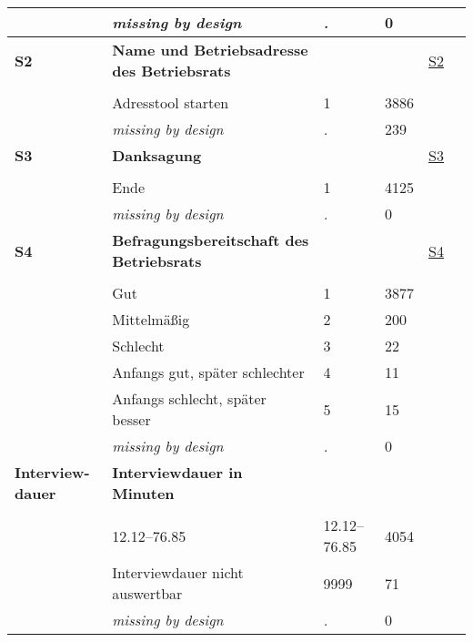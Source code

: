 \begin{longtable}{| L{2.45cm} | L{6cm} | C{1.5cm} | R{1cm} | C{2.25cm} | C{2.25cm} |}
   & \textit{missing by design} & \textit{.} & 0 &  &  \\ 
   \midrule
\textbf{S2}\label{var:S2} & \textbf{Name und Betriebsadresse des Betriebsrats} &  &  & \hyperref[S2]{S2} & \hyperref[var:suf:]{} \\ 
   &  &  &  &  &  \\ 
   & Adresstool starten & 1 & 3886 &  &  \\ 
   & \textit{missing by design} & \textit{.} & 239 &  &  \\ 
   \midrule
\textbf{S3}\label{var:S3} & \textbf{Danksagung} &  &  & \hyperref[S3]{S3} & \hyperref[var:suf:]{} \\ 
   &  &  &  &  &  \\ 
   & Ende & 1 & 4125 &  &  \\ 
   & \textit{missing by design} & \textit{.} & 0 &  &  \\ 
   \midrule
\textbf{S4}\label{var:S4} & \textbf{Befragungsbereitschaft des Betriebsrats} &  &  & \hyperref[S4]{S4} & \hyperref[var:suf:]{} \\ 
   &  &  &  &  &  \\ 
   & Gut & 1 & 3877 &  &  \\ 
   & Mittelmäßig & 2 & 200 &  &  \\ 
   & Schlecht & 3 & 22 &  &  \\ 
   & Anfangs gut, später schlechter & 4 & 11 &  &  \\ 
   & Anfangs schlecht, später besser & 5 & 15 &  &  \\ 
   & \textit{missing by design} & \textit{.} & 0 &  &  \\ 
   \midrule
\textbf{Interview-dauer}\label{var:Interviewdauer} & \textbf{Interviewdauer in Minuten} &  &  &  & \hyperref[var:suf:]{} \\ 
   &  &  &  &  &  \\ 
   & 12.12--76.85 & 12.12--76.85 & 4054 &  &  \\ 
   & Interviewdauer nicht auswertbar & 9999 & 71 &  &  \\ 
   & \textit{missing by design} & \textit{.} & 0 &  &  \\ 
  
\end{longtable}
